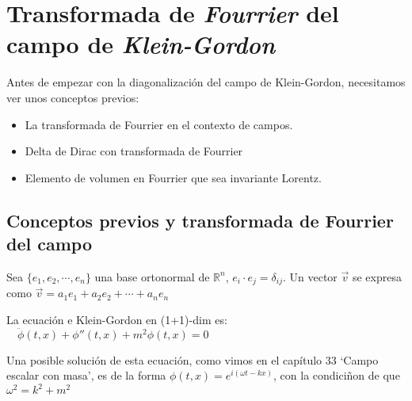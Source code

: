 \chapter{Transformada de \emph{Fourrier} del campo de \emph{Klein-Gordon}}


\vspace{10mm}
\begin{adjustwidth}{50pt}{50pt}
\begin{ejemplo}
\vspace{2mm}
Antes de empezar con la diagonalización del campo de Klein-Gordon, necesitamos ver unos conceptos previos:
\vspace{-3mm}\begin{itemize}
\vspace{-2mm}\item La transformada de Fourrier en el contexto de campos.
\vspace{-2mm}\item Delta de Dirac con transformada de Fourrier
\vspace{-2mm}\item Elemento de volumen en Fourrier que sea invariante Lorentz.	
\end{itemize}

\vspace{2mm}

\end{ejemplo}
\end{adjustwidth}

\vspace{5mm}

\section{Conceptos previos y transformada de Fourrier del campo}



Sea $\{e_1,e_2,\cdots ,e_n\}$ una base ortonormal de $\mathbb R^n$, $e_i\cdot e_j=\delta_{ij}$. Un vector $\vec v$ se expresa como $\vec v =a_1e_1+a_2e_2+\cdots +a_ne_n$

La ecuación e Klein-Gordon en (1+1)-dim es: $\quad \ddot \phi(t,x)+\phi''(t,x)+m^2\phi(t,x)=0$

Una posible solución de esta ecuación, como vimos en el capítulo 33 `Campo escalar con masa', es de la forma $\phi(t,x)=e^{i(\omega t-kx) }$, con la condiciñon de que $\omega^2=k^2+m^2$

